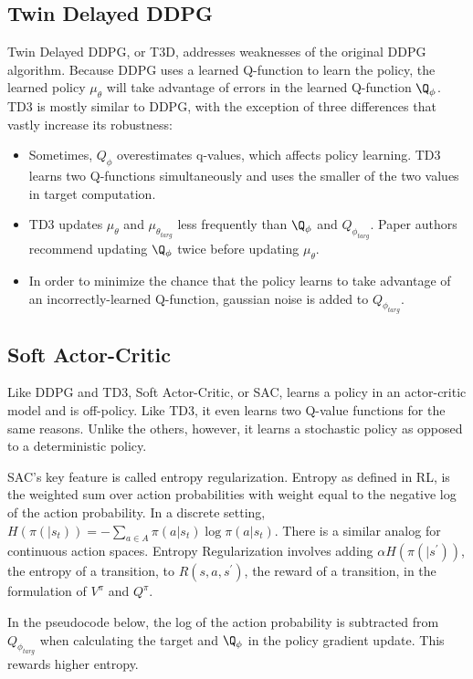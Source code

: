 \subsection{Twin Delayed DDPG}

Twin Delayed DDPG, or T3D, addresses weaknesses of the original DDPG algorithm. Because DDPG uses a learned Q-function to learn the policy, the learned policy $\mu_\theta$ will take advantage of errors in the learned Q-function $\Q_{\phi}$. TD3 is mostly similar to DDPG, with the exception of three differences that vastly increase its robustness:

\begin{itemize}
    \item Sometimes, $Q_{\phi}$ overestimates q-values, which affects policy learning. TD3 learns two Q-functions simultaneously and uses the smaller of the two values in target computation.
    \item TD3 updates $\mu_\theta$ and $\mu_\theta_{targ}$ less frequently than $\Q_{\phi}$ and $Q_{\phi_{targ}}$. Paper authors recommend updating $\Q_{\phi}$ twice before updating $\mu_\theta$.
    \item In order to minimize the chance that the policy learns to take advantage of an incorrectly-learned Q-function, gaussian noise is added to $Q_{\phi_{targ}}$.
\end{itemize}

\subsection{Soft Actor-Critic}

Like DDPG and TD3, Soft Actor-Critic, or SAC, learns a policy in an actor-critic model and is off-policy. Like TD3, it even learns two Q-value functions for the same reasons. Unlike the others, however, it learns a stochastic policy as opposed to a deterministic policy.

SAC's key feature is called entropy regularization. Entropy as defined in RL, is the weighted sum over action probabilities with weight equal to the negative log of the action probability. In a discrete setting, $H(\pi(|s_t)) = - \sum_{a \in A} \pi(a|s_t)\log\pi(a|s_t)$. There is a similar analog for continuous action spaces. Entropy Regularization involves adding $\alpha H(\pi(|s^\prime))$, the entropy of a transition, to $R(s, a, s^\prime)$, the reward of a transition, in the formulation of $V^\pi$ and $Q^\pi$. 

In the pseudocode below, the log of the action probability is subtracted from $Q_{\phi_{targ}}$ when calculating the target and $\Q_{\phi}$ in the policy gradient update. This rewards higher entropy. \\


